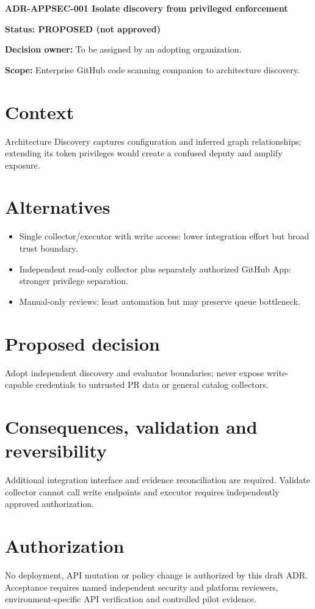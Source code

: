 \documentclass[11pt,letterpaper]{article}
\begin{document}
{\LARGE\bfseries ADR-APPSEC-001 Isolate discovery from privileged enforcement}\par
\textbf{Status: PROPOSED (not approved)}\par
\textbf{Decision owner:} To be assigned by an adopting organization.\par
\textbf{Scope:} Enterprise GitHub code scanning companion to architecture discovery.
\section{Context}
Architecture Discovery captures configuration and inferred graph relationships; extending its token privileges would create a confused deputy and amplify exposure.
\section{Alternatives}
\begin{itemize}
\item Single collector/executor with write access: lower integration effort but broad trust boundary.
\item Independent read-only collector plus separately authorized GitHub App: stronger privilege separation.
\item Manual-only reviews: least automation but may preserve queue bottleneck.
\end{itemize}
\section{Proposed decision}
Adopt independent discovery and evaluator boundaries; never expose write-capable credentials to untrusted PR data or general catalog collectors.
\section{Consequences, validation and reversibility}
Additional integration interface and evidence reconciliation are required. Validate collector cannot call write endpoints and executor requires independently approved authorization.
\section{Authorization}
No deployment, API mutation or policy change is authorized by this draft ADR. Acceptance requires named independent security and platform reviewers, environment-specific API verification and controlled pilot evidence.
\end{document}
